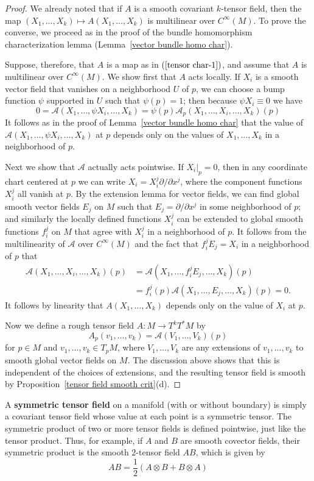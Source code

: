 \begin{proof}
We already noted that if $A$ is a smooth covariant $k$-tensor field, then the map $(X_1,\dots,X_k)\mapsto A(X_1,\dots,X_k)$ is multilinear over $C^\infty(M)$. To prove the converse, we proceed as in the proof of the bundle homomorphism characterization lemma (Lemma~\ref{vector bundle homo char}).\par
Suppose, therefore, that $A$ is a map as in $(\ref{tensor char-1})$, and assume that $A$ is multilinear over $C^\infty(M)$. We show first that $A$ acts locally. If $X_i$ is a smooth vector field that vanishes on a neighborhood $U$ of $p$, we can choose a bump function $\psi$ supported in $U$ such that $\psi(p)=1$; then because $\psi X_i\equiv0$ we have
\[0=\mathcal{A}(X_1,\dots,\psi X_i,\dots,X_k)=\psi(p)\mathcal{A}_p(X_1,\dots,X_i,\dots,X_k)(p)\]
It follows as in the proof of Lemma~\ref{vector bundle homo char} that the value of $\mathcal{A}(X_1,\dots,\psi X_i,\dots,X_k)$ at $p$ depends only on the values of $X_1,\dots,X_k$ in a neighborhood of $p$.\par
Next we show that $\mathcal{A}$ actually acts pointwise. If $X_i|_p=0$, then in any coordinate chart centered at $p$ we can write $X_i=X_i^j\partial/\partial x^j$, where the component functions $X_i^j$ all vanish at $p$. By the extension lemma for vector fields, we can find global smooth vector fields $E_j$ on $M$ such that $E_j=\partial/\partial x^j$ in some neighborhood of $p$; and similarly the locally defined functions $X^j_i$ can be extended to global smooth functions $f_i^j$ on $M$ that agree with $X^j_i$ in a neighborhood of $p$. It follows from the multilinearity of $\mathcal{A}$ over $C^\infty(M)$ and the fact that $f_i^jE_j=X_i$ in a neighborhood of $p$ that
\begin{align*}
\mathcal{A}(X_1,\dots,X_i,\dots,X_k)(p)&=\mathcal{A}(X_1,\dots,f_i^jE_j,\dots,X_k)(p)\\
&=f_i^j(p)\mathcal{A}(X_1,\dots,E_j,\dots,X_k)(p)=0.
\end{align*}
It follows by linearity that $A(X_1,\dots,X_k)$ depends only on the value of $X_i$ at $p$.\par
Now we define a rough tensor field $A:M\to T^kT^*M$ by
\[A_p(v_1,\dots,v_k)=\mathcal{A}(V_1,\dots,V_k)(p)\]
for $p\in M$ and $v_1,\dots,v_k\in T_pM$, where $V_1,\dots,V_k$ are any extensions of $v_1,\dots,v_k$ to smooth global vector fields on $M$. The discussion above shows that this is independent of the choices of extensions, and the resulting tensor field is smooth by Proposition~\ref{tensor field smooth crit}(d).
\end{proof}
A \textbf{symmetric tensor field} on a manifold (with or without boundary) is simply a covariant tensor field whose value at each point is a symmetric tensor. The 
symmetric product of two or more tensor fields is defined pointwise, just like the tensor product. Thus, for example, if $A$ and $B$ are smooth covector fields, 
their symmetric product is the smooth $2$-tensor field $AB$, which is given by
\[AB=\frac{1}{2}(A\otimes B+B\otimes A)\]
